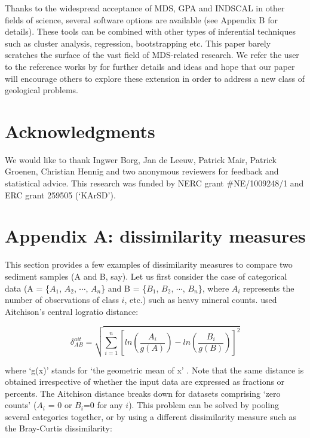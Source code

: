 \documentclass{article}
\begin{document}
Thanks to the widespread acceptance of MDS, GPA and INDSCAL in other
fields of science, several software options are available (see
Appendix B for details). These tools can be combined with other types
of inferential techniques such as cluster analysis, regression,
bootstrapping etc. This paper barely scratches the surface of the vast
field of MDS-related research. We refer the user to the reference
works by \citet{arabie1987, borg2005, borg2012, gower2004} for further
details and ideas and hope that our paper will encourage others to
explore these extension in order to address a new class of geological
problems.

\section*{Acknowledgments}

We would like to thank Ingwer Borg, Jan de Leeuw, Patrick Mair,
Patrick Groenen, Christian Hennig and two anonymous reviewers for feedback
and statistical advice. This research was funded by NERC grant 
\#NE/1009248/1 and ERC grant 259505 (`KArSD').

\section*{Appendix A: dissimilarity measures}

This section provides a few examples of dissimilarity measures to
compare two sediment samples (A and B, say). Let us first consider the
case of categorical data (A = \{$A_1$, $A_2$, $\cdots$, $A_n$\} and B
= \{$B_1$, $B_2$, $\cdots$, $B_n$\}, where $A_i$ represents the number
of observations of class $i$, etc.) such as heavy mineral counts.
\citet{vermeesch2013} used Aitchison’s central logratio distance:

\begin{equation}
\delta^{ait}_{AB} = \sqrt{\sum\limits_{i=1}^{n} \left[
ln\left(\frac{A_i}{g(A)}\right) - ln\left(\frac{B_i}{g(B)}\right)
\right]^2}
\label{eq:aitchison}
\end{equation}

where `g(x)’ stands for `the geometric mean of x’
\citep{aitchison1986, vermeesch2013}.  Note that the same distance is
obtained irrespective of whether the input data are expressed as
fractions or percents. The Aitchison distance breaks down for datasets
comprising `zero counts' ($A_i$ = 0 or $B_i$=0 for any $i$).  This
problem can be solved by pooling several categories together, or by
using a different dissimilarity measure such as the Bray-Curtis
dissimilarity:
\end{document}
